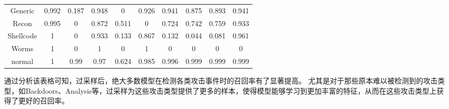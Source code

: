 \begin{table}[htbp]
\begin{tabular}{cccccccccc}
		Generic   & 0.992 & 0.187 & 0.948 & 0     & 0.926 & 0.941 & 0.875 & 0.893  & 0.941 \\
		Recon     & 0.995 & 0     & 0.872 & 0.511 & 0     & 0.724 & 0.742 & 0.759  & 0.933 \\
		Shellcode & 1     & 0     & 0.933 & 0.133 & 0.867 & 0.132 & 0.044 & 0.081  & 0.961 \\
		Worms     & 1     & 0     & 1     & 0     & 1     & 0     & 0     & 0      & 0     \\
		normal    & 1     & 0.99  & 0.97  & 0.624 & 0.985 & 0.996 & 0.999 & 0.999  & 0.999 \\
		\bottomrule
	\end{tabular}
\end{table}
通过分析该表格可知，过采样后，绝大多数模型在检测各类攻击事件时的召回率有了显著提高。
尤其是对于那些原本难以被检测到的攻击类型，如Backdoors、Analysis等，过采样为这些攻击类型提供了更多的样本，使得模型能够学习到更加丰富的特征，从而在这些攻击类型上获得了更好的召回率。\par

